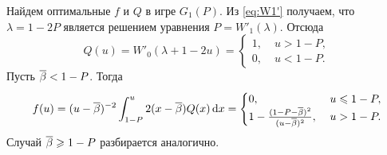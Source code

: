 \begin{example}
  Найдем оптимальные $f$ и $Q$ в игре $G_1(P)$. Из \eqref{eq:W1'} получаем, что
  $\lambda = 1 - 2P$ является решением уравнения $P = W'_1(\lambda)$. Отсюда
  \begin{equation*}
    Q(u) = W'_0(\lambda + 1 - 2u) = \begin{cases}
      1, &\; u > 1 - P,\\
      0, &\; u < 1 - P.
    \end{cases}
  \end{equation*}
  Пусть ${\overline{\beta}} < 1 - P$. Тогда
  \begin{equation*}
    f(u) = (u - {\overline{\beta}})^{-2} \int_{1-P}^u 2 (x - {\overline{\beta}}) Q(x) \mathop{}\!\mathrm{d} x =
    \begin{cases}
      0, &\; u \leqslant 1 - P,\\
      1 - \frac{(1 - P - {\overline{\beta}})^2}{(u-{\overline{\beta}})^2}, &\; u > 1 - P.
    \end{cases}
  \end{equation*}
  Случай ${\overline{\beta}} \geqslant 1 - P$ разбирается аналогично.
\end{example}

